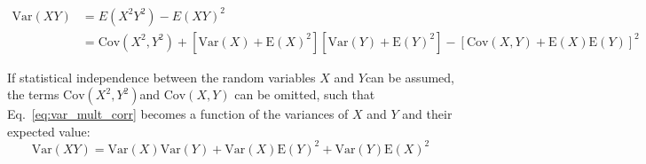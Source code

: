 \begin{align}
\label{eq:var_mult_corr}
\mathrm{Var}(X Y)&=E\left(X^{2} Y^{2}\right)-E(X Y)^{2} \\
&= \mathrm{Cov}\left(X^{2}, Y^{2}\right)+\left[\mathrm{Var}(X)+\mathrm{E}(X)^{2}\right] \left[\mathrm{Var}(Y)+\mathrm{E}(Y)^{2}\right]-[\mathrm{Cov}\left(X, Y\right)+\mathrm{E}(X)  \mathrm{E}(Y)]^{2} \nonumber
\end{align}

If statistical independence between the random variables $X$ and $Y$can be assumed, the terms $\mathrm{Cov}\left(X^{2}, Y^{2}\right)$and $\mathrm{Cov}\left(X, Y\right)$ can be omitted, such that Eq.~\ref{eq:var_mult_corr} becomes a function of the variances of $X$ and $Y$ and their expected value:
\begin{equation}
\label{eq:unc_prod}
\mathrm{Var}(XY) = \mathrm{Var}(X)\mathrm{Var}(Y) + \mathrm{Var}(X) \mathrm{E}(Y)^2 + \mathrm{Var}(Y) \mathrm{E}(X)^2
\end{equation}
